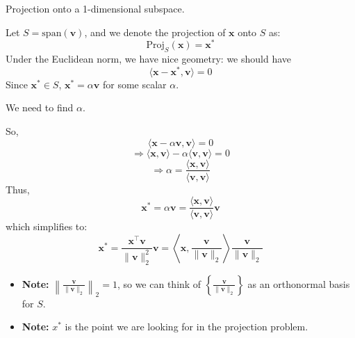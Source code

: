         \begin{example}
            Projection onto a 1-dimensional subspace.

            Let \( S = \text{span}(\mathbf{v}) \), and we denote the projection of \( \mathbf{x} \) onto \( S \) as:
            \[
            \text{Proj}_S(\mathbf{x}) = \mathbf{x}^*
            \]
            Under the Euclidean norm, we have nice geometry: we should have
            \[
            \langle \mathbf{x} - \mathbf{x}^*, \mathbf{v} \rangle = 0
            \]
            Since \( \mathbf{x}^* \in S \), \( \mathbf{x}^* = \alpha \mathbf{v} \) for some scalar \( \alpha \).

            We need to find \( \alpha \).

            So,
            \[
            \langle \mathbf{x} - \alpha \mathbf{v}, \mathbf{v} \rangle = 0
            \]
            \[
            \Rightarrow \langle \mathbf{x}, \mathbf{v} \rangle - \alpha \langle \mathbf{v}, \mathbf{v} \rangle = 0
            \]
            \[
            \Rightarrow \alpha = \frac{\langle \mathbf{x}, \mathbf{v} \rangle}{\langle \mathbf{v}, \mathbf{v} \rangle}
            \]
            Thus, 
            \[
            \mathbf{x}^* = \alpha \mathbf{v} = \frac{\langle \mathbf{x}, \mathbf{v} \rangle}{\langle \mathbf{v}, \mathbf{v} \rangle} \mathbf{v}
            \]
            which simplifies to:
            \[
            \mathbf{x}^* = \frac{\mathbf{x}^\top \mathbf{v}}{\|\mathbf{v}\|_2^2} \mathbf{v} = \left\langle \mathbf{x}, \frac{\mathbf{v}}{\|\mathbf{v}\|_2} \right\rangle \frac{\mathbf{v}}{\|\mathbf{v}\|_2}
            \]
            \begin{itemize}
                \item \textbf{Note:} \( \left\lVert \frac{\mathbf{v}}{\|\mathbf{v}\|_2} \right\rVert_2 = 1 \), so we can think of \( \left\{ \frac{\mathbf{v}}{\|\mathbf{v}\|_2} \right\} \) as an orthonormal basis for \( S \).
                \item \textbf{Note:} $x^*$ is the point we are looking for in the projection problem.
            \end{itemize}
        \end{example}

